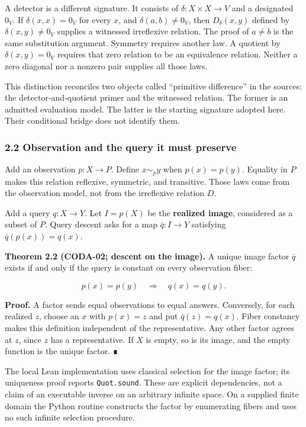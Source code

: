 \documentclass[
  11pt,
]{article}
\begin{document}
A detector is a different signature. It consists of \(\delta:X\times X\to V\) and a designated \(0_V\). If \(\delta(x,x)=0_V\) for every \(x\), and \(\delta(a,b)\ne0_V\), then \(D_\delta(x,y)\) defined by \(\delta(x,y)\ne0_V\) supplies a witnessed irreflexive relation. The proof of \(a\ne b\) is the same substitution argument. Symmetry requires another law. A quotient by \(\delta(x,y)=0_V\) requires that zero relation to be an equivalence relation. Neither a zero diagonal nor a nonzero pair supplies all those laws.

This distinction reconciles two objects called ``primitive difference'' in the sources: the detector-and-quotient primer and the witnessed relation. The former is an admitted evaluation model. The latter is the starting signature adopted here. Their conditional bridge does not identify them.

\subsubsection{2.2 Observation and the query it must preserve}\label{observation-and-the-query-it-must-preserve}

Add an observation \(p:X\to P\). Define \(x\sim_p y\) when \(p(x)=p(y)\). Equality in \(P\) makes this relation reflexive, symmetric, and transitive. Those laws come from the observation model, not from the irreflexive relation \(D\).

Add a query \(q:X\to Y\). Let \(I=p(X)\) be the \textbf{realized image}, considered as a subset of \(P\). Query descent asks for a map \(\bar q:I\to Y\) satisfying \(\bar q(p(x))=q(x)\).

\textbf{Theorem 2.2 (CODA-02; descent on the image).} A unique image factor \(\bar q\) exists if and only if the query is constant on every observation fiber:

\[
 p(x)=p(y)\quad\Longrightarrow\quad q(x)=q(y).
\]

\textbf{Proof.} A factor sends equal observations to equal answers. Conversely, for each realized \(z\), choose an \(x\) with \(p(x)=z\) and put \(\bar q(z)=q(x)\). Fiber constancy makes this definition independent of the representative. Any other factor agrees at \(z\), since \(z\) has a representative. If \(X\) is empty, so is its image, and the empty function is the unique factor. ∎

The local Lean implementation uses classical selection for the image factor; its uniqueness proof reports \texttt{Quot.sound}. These are explicit dependencies, not a claim of an executable inverse on an arbitrary infinite space. On a supplied finite domain the Python routine constructs the factor by enumerating fibers and uses no such infinite selection procedure.
\end{document}
